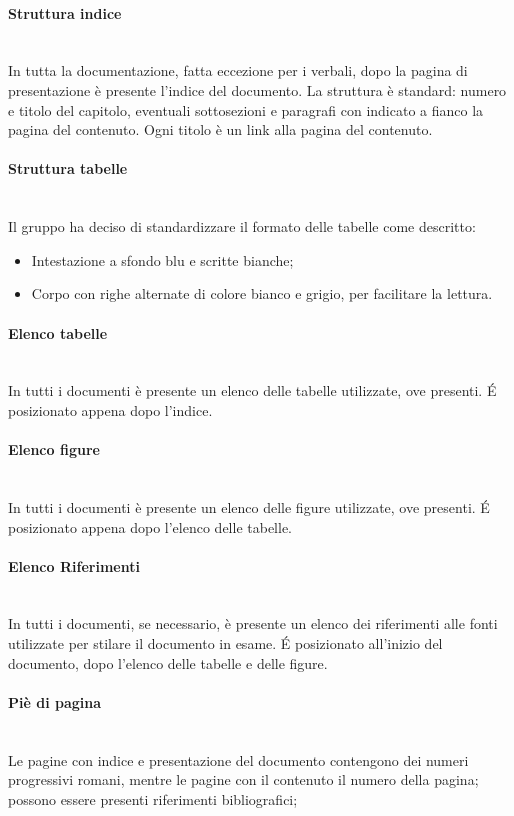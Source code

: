 \paragraph{Struttura indice} \-\\
In tutta la documentazione, fatta eccezione per i verbali, dopo la pagina di presentazione è presente l'indice del documento. La struttura è standard: numero e titolo del capitolo, eventuali sottosezioni e paragrafi con indicato a fianco la pagina del contenuto. Ogni titolo è un link alla pagina del contenuto. 

\paragraph{Struttura tabelle} \-\\
Il gruppo ha deciso di standardizzare il formato delle tabelle come descritto:
\begin{itemize}
	\item Intestazione a sfondo blu e scritte bianche;
	\item Corpo con righe alternate di colore bianco e grigio, per facilitare la lettura.
\end{itemize}

\paragraph{Elenco tabelle} \-\\
In tutti i documenti è presente un elenco delle tabelle utilizzate, ove presenti. \'E posizionato appena dopo l'indice.  

\paragraph{Elenco figure} \-\\
In tutti i documenti è presente un elenco delle figure utilizzate, ove presenti. \'E posizionato appena dopo l'elenco delle tabelle.

\paragraph{Elenco Riferimenti} \-\\
In tutti i documenti, se necessario, è presente un elenco dei riferimenti alle fonti utilizzate per stilare il documento in esame. \'E posizionato all'inizio del documento, dopo l'elenco delle tabelle e delle figure.

\paragraph{Piè di pagina} \-\\ 
Le pagine con indice e presentazione del documento contengono dei numeri progressivi romani, mentre le pagine con il contenuto il numero della pagina; possono essere presenti riferimenti bibliografici;

